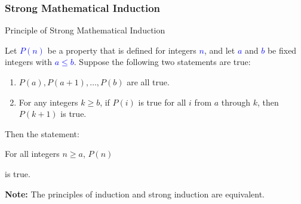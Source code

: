 \documentclass{beamer}
\begin{document}
\begin{frame}%
\frametitle{Strong Mathematical Induction}

\footnotesize

\begin{block}{Principle of Strong Mathematical Induction}

Let \textcolor{blue}{$P(n)$} be a property that is defined for integers \textcolor{blue}{$n$}, and let \textcolor{blue}{$a$} and \textcolor{blue}{$b$}
be fixed integers with \textcolor{blue}{$a \le b$}.
Suppose the following two statements are true:\\
\begin{enumerate}
\item<2-> $P(a), P(a+1), \ldots, P(b)$ are all true.\\

\item<2-> For any integers $k \ge b$, if $P(i)$ is true for all $i$ from $a$ through $k$, then $P(k+1)$ is true.\\
\end{enumerate}
Then the statement:
\begin{center}
For all integers $n \ge a$, $P(n)$
\end{center}
is true.
\end{block}
\vspace{0.3cm}
\textbf{Note:} The principles of induction and strong induction are equivalent.

\end{frame}

\end{document}
